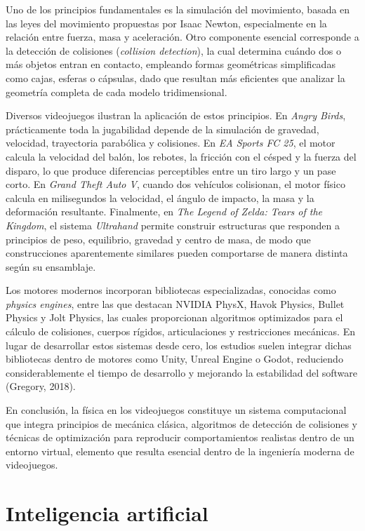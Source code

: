 \documentclass[12pt]{report}
\begin{document}
Uno de los principios fundamentales es la simulación del movimiento, basada en las leyes del movimiento propuestas por Isaac Newton, especialmente en la relación entre fuerza, masa y aceleración. Otro componente esencial corresponde a la detección de colisiones (\textit{collision detection}), la cual determina cuándo dos o más objetos entran en contacto, empleando formas geométricas simplificadas como cajas, esferas o cápsulas, dado que resultan más eficientes que analizar la geometría completa de cada modelo tridimensional.

Diversos videojuegos ilustran la aplicación de estos principios. En \textit{Angry Birds}, prácticamente toda la jugabilidad depende de la simulación de gravedad, velocidad, trayectoria parabólica y colisiones. En \textit{EA Sports FC 25}, el motor calcula la velocidad del balón, los rebotes, la fricción con el césped y la fuerza del disparo, lo que produce diferencias perceptibles entre un tiro largo y un pase corto. En \textit{Grand Theft Auto V}, cuando dos vehículos colisionan, el motor físico calcula en milisegundos la velocidad, el ángulo de impacto, la masa y la deformación resultante. Finalmente, en \textit{The Legend of Zelda: Tears of the Kingdom}, el sistema \textit{Ultrahand} permite construir estructuras que responden a principios de peso, equilibrio, gravedad y centro de masa, de modo que construcciones aparentemente similares pueden comportarse de manera distinta según su ensamblaje.

Los motores modernos incorporan bibliotecas especializadas, conocidas como \textit{physics engines}, entre las que destacan NVIDIA PhysX, Havok Physics, Bullet Physics y Jolt Physics, las cuales proporcionan algoritmos optimizados para el cálculo de colisiones, cuerpos rígidos, articulaciones y restricciones mecánicas. En lugar de desarrollar estos sistemas desde cero, los estudios suelen integrar dichas bibliotecas dentro de motores como Unity, Unreal Engine o Godot, reduciendo considerablemente el tiempo de desarrollo y mejorando la estabilidad del software (Gregory, 2018).

En conclusión, la física en los videojuegos constituye un sistema computacional que integra principios de mecánica clásica, algoritmos de detección de colisiones y técnicas de optimización para reproducir comportamientos realistas dentro de un entorno virtual, elemento que resulta esencial dentro de la ingeniería moderna de videojuegos.

\section{Inteligencia artificial}
\end{document}
